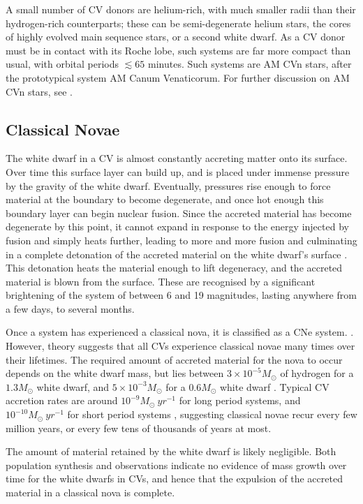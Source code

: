A small number of CV donors are helium-rich, with much smaller radii than their hydrogen-rich counterparts; these can be semi-degenerate helium stars, the cores of highly evolved main sequence stars, or a second white dwarf.
As a CV donor must be in contact with its Roche lobe, such systems are far more compact than usual, with orbital periods $\lesssim 65$ minutes. Such systems are AM CVn stars, after the prototypical system AM Canum Venaticorum. For further discussion on AM CVn stars, see \citep{solheim2010}.


\subsection{Classical Novae}
\label{sect:introduction:classical novae}

The white dwarf in a CV is almost constantly accreting matter onto its surface. Over time this surface layer can build up, and is placed under immense pressure by the gravity of the white dwarf. Eventually, pressures rise enough to force material at the boundary to become degenerate, and once hot enough this boundary layer can begin nuclear fusion.
Since the accreted material has become degenerate by this point, it cannot expand in response to the energy injected by fusion and simply heats further, leading to more and more fusion and culminating in a complete detonation of the accreted material on the white dwarf's surface \citep{warner1995}. This detonation heats the material enough to lift degeneracy, and the accreted material is blown from the surface.
These are recognised by a significant brightening of the system of between 6 and 19 magnitudes, lasting anywhere from a few days, to several months.

Once a system has experienced a classical nova, it is classified as a CNe system. \citep{warner1995}. However, theory suggests that all CVs experience classical novae many times over their lifetimes. The required amount of accreted material for the nova to occur depends on the white dwarf mass, but lies between $3\times10^{-5} M_\odot$ of hydrogen for a $1.3 M_\odot$ white dwarf, and $5\times10^{-3} M_\odot$ for a $0.6 M_\odot$ white dwarf \citep{hellier2001}. Typical CV accretion rates are around $10^{-9} M_\odot\ yr^{-1}$ for long period systems, and $10^{-10} M_\odot\ yr^{-1}$ for short period systems \citep{hellier2001, Pala2021}, suggesting classical novae recur every few million years, or every few tens of thousands of years at most.

The amount of material retained by the white dwarf is likely negligible. Both population synthesis \citep{Wijnen2015} and observations \citep{mcallister2017} indicate no evidence of mass growth over time for the white dwarfs in CVs, and hence that the expulsion of the accreted material in a classical nova is complete.

